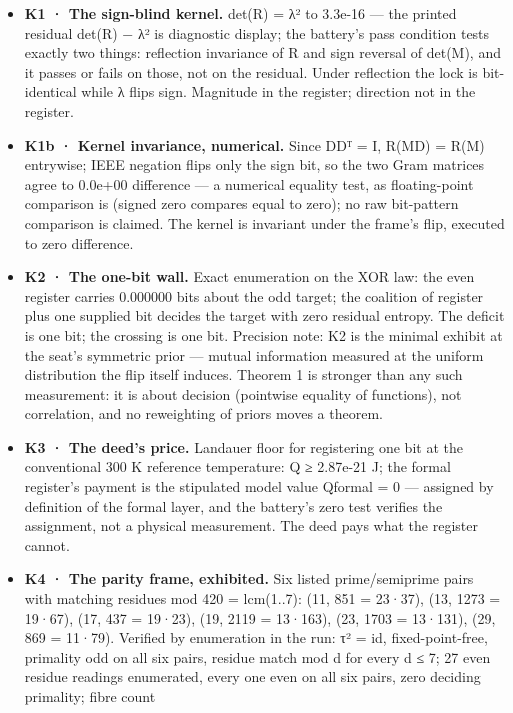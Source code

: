 \documentclass[10pt]{article}
\renewcommand{\_}{\origunderscore\allowbreak}
\providecommand{\tightlist}{\setlength{\itemsep}{0pt}\setlength{\parskip}{0pt}}
\begin{document}
\begin{itemize}
\tightlist
\item
  \textbf{K1 · The sign-blind kernel.} det(R) = λ² to 3.3e-16 --- the
  printed residual \textbar det(R) − λ²\textbar{} is diagnostic display;
  the battery's pass condition tests exactly two things: reflection
  invariance of R and sign reversal of det(M), and it passes or fails on
  those, not on the residual. Under reflection the lock is bit-identical
  while λ flips sign. Magnitude in the register; direction not in the
  register.
\item
  \textbf{K1b · Kernel invariance, numerical.} Since DDᵀ = I, R(MD) =
  R(M) entrywise; IEEE negation flips only the sign bit, so the two Gram
  matrices agree to 0.0e+00 difference --- a numerical equality test, as
  floating-point comparison is (signed zero compares equal to zero); no
  raw bit-pattern comparison is claimed. The kernel is invariant under
  the frame's flip, executed to zero difference.
\item
  \textbf{K2 · The one-bit wall.} Exact enumeration on the XOR law: the
  even register carries 0.000000 bits about the odd target; the
  coalition of register plus one supplied bit decides the target with
  zero residual entropy. The deficit is one bit; the crossing is one
  bit. Precision note: K2 is the minimal exhibit at the seat's symmetric
  prior --- mutual information measured at the uniform distribution the
  flip itself induces. Theorem 1 is stronger than any such measurement:
  it is about decision (pointwise equality of functions), not
  correlation, and no reweighting of priors moves a theorem.
\item
  \textbf{K3 · The deed's price.} Landauer floor for registering one bit
  at the conventional 300 K reference temperature: Q ≥ 2.87e-21 J; the
  formal register's payment is the stipulated model value Q\_formal = 0
  --- assigned by definition of the formal layer, and the battery's zero
  test verifies the assignment, not a physical measurement. The deed
  pays what the register cannot.
\item
  \textbf{K4 · The parity frame, exhibited.} Six listed prime/semiprime
  pairs with matching residues mod 420 = lcm(1..7): (11, 851 = 23·37),
  (13, 1273 = 19·67), (17, 437 = 19·23), (19, 2119 = 13·163), (23, 1703
  = 13·131), (29, 869 = 11·79). Verified by enumeration in the run: τ² =
  id, fixed-point-free, primality odd on all six pairs, residue match
  mod d for every d ≤ 7; 27 even residue readings enumerated, every one
  even on all six pairs, zero deciding primality; fibre count

\end{itemize}
\end{document}
